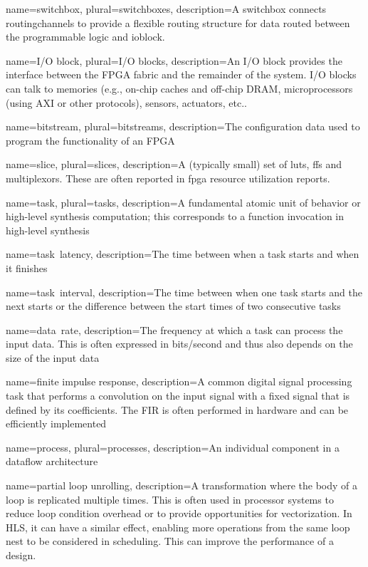 {
	name={switchbox},
	plural={switchboxes},
	description={A switchbox connects \gls{routingchannel}s to provide a flexible routing structure for data routed between the programmable logic and \gls{ioblock}. }
}

{
	name={I/O block},
	plural={I/O blocks},
	description={An I/O block provides the interface between the FPGA fabric and the remainder of the system. I/O blocks can talk to memories (e.g., on-chip caches and off-chip DRAM, microprocessors (using AXI or other protocols), sensors, actuators, etc.. }
}


{
	name={bitstream},
	plural={bitstreams},
	description={The configuration data used to program the functionality of an FPGA}
}

{
	name={slice},
	plural={slices},
	description={A (typically small) set of \glspl{lut}, \glspl{ff} and multiplexors. These are often reported in \gls{fpga} resource utilization reports. }
}


{
	name={task},
	plural={tasks},
	description={A fundamental atomic unit of behavior or high-level synthesis computation; this corresponds to a function invocation in high-level synthesis}
}

{
	name={task~latency},
	description={The time between when a task starts and when it finishes}
}


{
	name={task~interval},
	description={The time between when one task starts and the next starts or the difference between the start times of two consecutive tasks}
}

{
	name={data~rate},
	description={The frequency at which a task can process the input data. This is often expressed in bits/second and thus also depends on the size of the input data}
}

{
	name={finite impulse response},
	description={A common digital signal processing task that performs a convolution on the input signal with a fixed signal that is defined by its coefficients. The FIR is often performed in hardware and can be efficiently implemented}
}

{
	name={process},
	plural={processes},
	description={An individual component in a dataflow architecture}
}

{
	name={partial loop unrolling},
	description={A transformation where the body of a loop is replicated multiple times.  This is often used in processor systems to reduce loop condition overhead or to provide opportunities for vectorization.  In HLS, it can have a similar effect, enabling more operations from the same loop nest to be considered in scheduling.  This can improve the performance of a design.}
}

